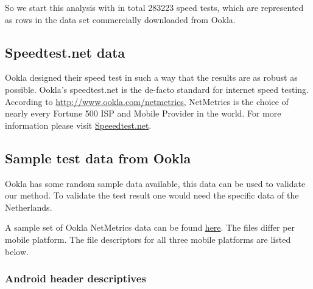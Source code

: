 \documentclass[]{article}
\begin{document}
\newpage
So we start this analysis with in total 283223 speed tests, which are
represented as rows in the data set commercially downloaded from Ookla.

\subsection{Speedtest.net data}\label{speedtest.net-data}

Ookla designed their speed test in such a way that the results are as
robust as possible. Ookla's speedtest.net is the de-facto standard for
internet speed testing. According to
\url{http://www.ookla.com/netmetrics}, NetMetrics is the choice of
nearly every Fortune 500 ISP and Mobile Provider in the world. For more
information please visit
\href{https://support.speedtest.net/hc/en-us}{Speeedtest.net}.

\subsection{Sample test data from
Ookla}\label{sample-test-data-from-ookla}

Ookla has some random sample data available, this data can be used to
validate our method. To validate the test result one would need the
specific data of the Netherlands.

A sample set of Ookla NetMetrics data can be found
\href{http://www.ookla.com/netmetrics}{here}. The files differ per
mobile platform. The file descriptors for all three mobile platforms are
listed below.

\subsubsection{Android header
descriptives}\label{android-header-descriptives}

\footnotesize
\end{document}
